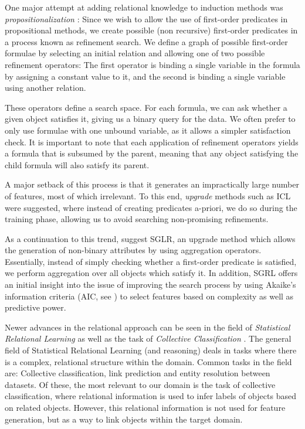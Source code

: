 \documentclass[12pt, a4paper]{article}
\theoremstyle{definition}
\begin{document}
One major attempt at adding relational knowledge to induction methods was \emph{propositionalization} \citep{kramer2000bottom}: Since we wish to allow the use of first-order predicates in propositional methods, we create possible (non recursive) first-order predicates in a process known as refinement search.
We define a graph of possible first-order formulae by selecting an initial relation and allowing one of two possible refinement operators: The first operator is binding a single variable in the formula by assigning a constant value to it, and the second is binding a single variable using another relation.

These operators define a search space. For each formula, we can ask whether a given object satisfies it, giving us a binary query for the data. We often prefer to only use formulae with one unbound variable, as it allows a simpler satisfaction check.
It is important to note that each application of refinement operators yields a formula that is subsumed by the parent, meaning that any object satisfying the child formula will also satisfy its parent.

A major setback of this process is that it generates an impractically large number of features, most of which irrelevant.  To this end, \emph{upgrade} methods such as ICL \citep{van2001upgrade} were suggested, where instead of creating predicates a-priori, we do so during the training phase, allowing us to avoid searching non-promising refinements.

As a continuation to this trend, \citet{popescul200716} suggest SGLR, an upgrade method which allows the generation of non-binary attributes by using aggregation operators. Essentially, instead of simply checking whether a first-order predicate is satisfied, we perform aggregation over all objects which satisfy it. In addition, SGRL offers an initial insight into the issue of improving the search process by using Akaike's information criteria (AIC, see \citet{burnham2002model}) to select features based on complexity as well as predictive power.

Newer advances in the relational approach can be seen in the field of \emph{Statistical Relational Learning} \citep{blockeel2013statistical, nath2014learning} as well as the task of \emph{Collective Classification} \citep{kajdanowicz2013collective, laorden2012collective}. The general field of Statistical Relational Learning (and reasoning) deals in tasks where there is a complex, relational structure within the domain. Common tasks in the field are: Collective classification, link prediction and entity resolution between datasets. Of these, the most relevant to our domain is the task of collective classification, where relational information is used to infer labels of objects based on related objects. However, this relational information is not used for feature generation, but as a way to link objects within the target domain.
\end{document}
